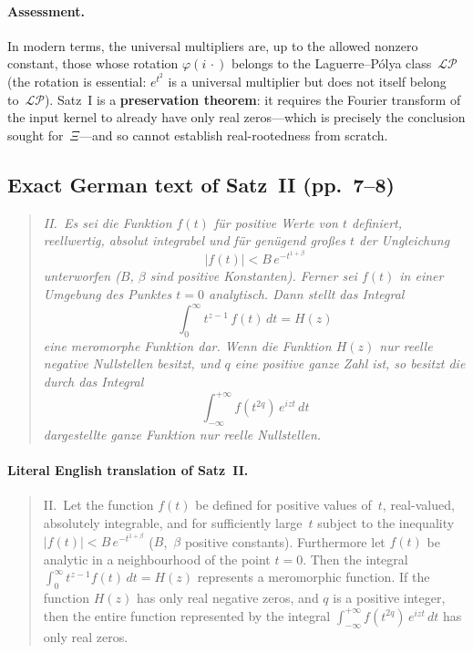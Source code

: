 \documentclass[11pt]{article}
\theoremstyle{definition}
\theoremstyle{remark}
\begin{document}
\paragraph{Assessment.}
In modern terms, the universal multipliers are, up to the allowed
nonzero constant, those whose rotation $\varphi(i\,\cdot)$ belongs to
the Laguerre--P\'{o}lya class~$\mathcal{LP}$ (the rotation is essential:
$e^{t^2}$ is a universal multiplier but does not itself belong
to~$\mathcal{LP}$).
Satz~I is a \textbf{preservation theorem}: it requires the Fourier transform of the
input kernel to already have only real zeros---which is precisely the conclusion
sought for~$\Xi$---and so cannot establish real-rootedness from scratch.

\subsection{Exact German text of Satz~II (pp.~7--8)}\label{sec:satzii}

\begin{quote}\itshape
II.\ Es sei die Funktion $f(t)$ f\"{u}r positive Werte von $t$ definiert,
reellwertig, absolut integrabel und f\"{u}r gen\"{u}gend gro\ss{}es $t$
der Ungleichung
\[|f(t)| < B\,e^{-t^{1+\beta}}\]
unterworfen ($B$, $\beta$ sind positive Konstanten).
Ferner sei $f(t)$ in einer Umgebung des Punktes $t = 0$ analytisch.
Dann stellt das Integral
\[\int_0^{\infty} t^{z-1}\,f(t)\,dt = H(z)\]
eine meromorphe Funktion dar.
Wenn die Funktion $H(z)$ nur reelle negative Nullstellen besitzt,
und $q$ eine positive ganze Zahl ist, so besitzt die durch das Integral
\[\int_{-\infty}^{+\infty} f(t^{2q})\,e^{izt}\,dt\]
dargestellte ganze Funktion nur reelle Nullstellen.
\end{quote}

\paragraph{Literal English translation of Satz~II.}
\begin{quote}
II.\ Let the function $f(t)$ be defined for positive values of~$t$, real-valued,
absolutely integrable, and for sufficiently large~$t$ subject to the inequality
$|f(t)| < B\,e^{-t^{1+\beta}}$ ($B$,~$\beta$ positive constants).
Furthermore let $f(t)$ be analytic in a neighbourhood of the point $t = 0$.
Then the integral $\int_0^{\infty} t^{z-1} f(t)\,dt = H(z)$ represents a
meromorphic function.
If the function $H(z)$ has only real negative zeros, and $q$ is a positive
integer, then the entire function represented by the integral
$\int_{-\infty}^{+\infty} f(t^{2q})\,e^{izt}\,dt$ has only real zeros.
\end{quote}
\end{document}
